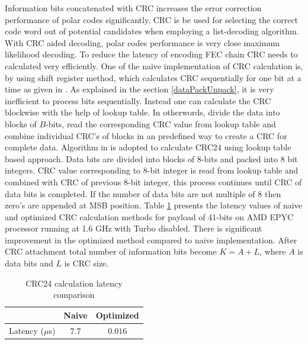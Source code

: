 Information bits concatenated with CRC increases the error correction performance of polar codes significantly. CRC is be used for selecting the correct code word out of potential candidates when employing a list-decoding algorithm. With CRC aided decoding, polar codes performance is very close maximum likelihood decoding. To reduce the latency of encoding FEC chain CRC needs to calculated very efficiently. One of the naive implementation of CRC calculation is, by using shift register method, which calculates CRC sequentially for one bit at a time as given in \cite{naiveCRCCalculation}. As explained in the section \ref{dataPackUnpack}, it is very inefficient to process bits sequentially. Instead one can calculate the CRC blockwise with the help of lookup table. In otherwords, divide the data into blocks of $B$-bits, read the corresponding CRC value from lookup table and combine individual CRC's of blocks in an predefined way to create a CRC for complete data. Algorithm in \cite{Sarwate:1988:CCR:63030.63037} is adopted to calculate CRC24 using lookup table based approach. Data bits are divided into blocks of 8-bits and packed into 8 bit integers. CRC value corresponding to 8-bit integer is read from lookup table and combined with CRC of previous 8-bit integer, this process continues until CRC of data bits is completed. If the number of data bits are not multiple of 8 then zero's are appended at MSB position.  Table \ref{tab:crcLatencyTable} presents the latency values of naive and optimized  CRC calculation methods for payload of 41-bits on AMD EPYC processor running at 1.6 GHz with Turbo disabled. There is significant improvement in the optimized method compared to naive implementation. After CRC attachment total number of information bits become $K = A + L$, where $ A $ is data bits and $ L $ is CRC size.

\begin{table}[h!]
	\begin{center}
		\caption{CRC24 calculation latency comparison}
		\label{tab:crcLatencyTable}
		\begin{tabular}{c|c|c} %
			\textbf{ } & Naive & Optimized \\
			\hline
			Latency ($\mu$s) & $7.7$ & $0.016$\\
		\end{tabular}
	\end{center}
\end{table}

